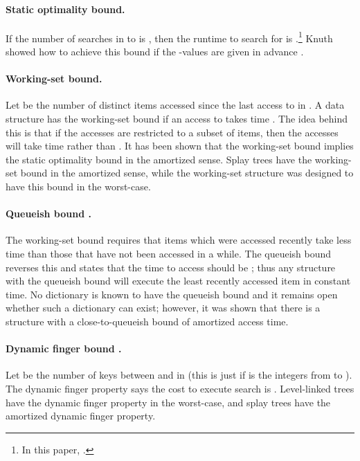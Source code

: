 \documentclass{llncs}
\begin{document}
\paragraph{Static optimality bound.} If the number of searches in  to  is , then the runtime to search for  is .\footnote{In this paper,  .} Knuth showed how to achieve this bound if the -values are given in advance \cite{DBLP:journals/acta/Knuth71}.

\paragraph{Working-set bound.} Let  be the number of distinct items accessed since the last access to  in . A data structure has the working-set bound if an access to  takes time . The idea behind this is that if the accesses are restricted to a subset of  items, then the accesses will take time  rather than . It has been shown that the working-set bound implies the static optimality bound in the amortized sense. Splay trees \cite{DBLP:journals/jacm/SleatorT85} have the working-set bound in the amortized sense, while the working-set structure \cite{DBLP:conf/soda/Iacono01a} was designed to have this bound in the worst-case.

\paragraph{Queueish bound \cite{DBLP:journals/algorithmica/IaconoL05}.} The working-set bound requires that items which were accessed recently take less time than those that have not been accessed in a while. The queueish bound reverses this and states that the time to access  should be ; thus any structure with the queueish bound will execute the least recently accessed item in constant time. No dictionary is known to have the queueish bound and it remains open whether such a dictionary can exist; however, it was shown that there is a structure with a close-to-queueish bound of  amortized access time.

\paragraph{Dynamic finger bound \cite{DBLP:journals/siamcomp/ColeMSS00,DBLP:journals/siamcomp/Cole00}.} Let  be the number of keys between  and  in  (this is just  if  is the integers from  to ). The dynamic finger property says the cost to execute search  is . Level-linked trees \cite{DBLP:journals/iandc/HoffmanMRT86} have the dynamic finger property in the worst-case, and splay trees have the amortized dynamic finger property.
\end{document}
